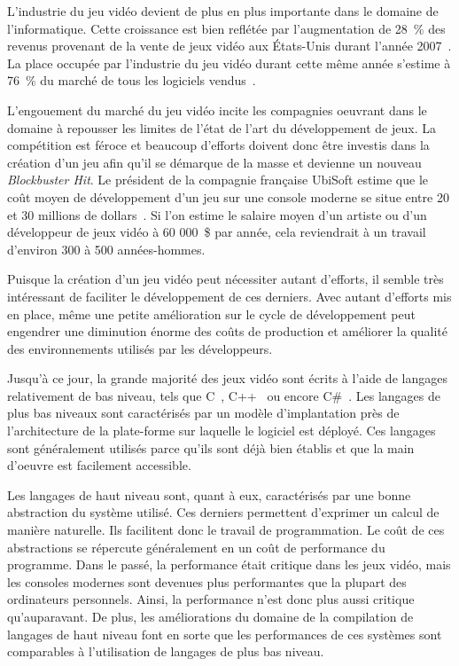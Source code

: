 \documentclass[12pt,twoside,letterpaper,francais]{book}
\begin{document}
L'industrie du jeu vidéo devient de plus en plus importante dans le
domaine de l'informatique. Cette croissance est bien reflétée par
l'augmentation de 28~\% des revenus provenant de la vente de jeux vidéo
aux États-Unis durant l'année 2007~\cite{NPD_Games_2007}. La place
occupée par l'industrie du jeu vidéo durant cette même année s'estime
à 76~\% du marché de tous les logiciels vendus~\cite{NPD_Soft_2008}. 

L'engouement du marché du jeu vidéo incite les compagnies oeuvrant
dans le domaine à repousser les limites de l'état de l'art du
dévelop\-pement de jeux. La compétition est féroce et beaucoup d'efforts
doivent donc être investis dans la création d'un jeu afin qu'il se
démarque de la masse et devienne un nouveau \textit{Blockbuster
  Hit}. Le président de la compagnie française UbiSoft estime que le
coût moyen de dévelop\-pement d'un jeu sur une console moderne se situe
entre 20 et 30 millions de dollars~\cite{cbc_ubisoft}. Si l'on estime
le salaire moyen d'un artiste ou d'un développeur de jeux vidéo à 60
000~\$ par année, cela reviendrait à un travail d'environ 300 à 500
années-hommes.

Puisque la création d'un jeu vidéo peut nécessiter autant d'efforts,
il semble très intéressant de faciliter le dévelop\-pement de ces
derniers. Avec autant d'efforts mis en place, même une petite
amélioration sur le cycle de dévelop\-pement peut engendrer une
diminution énorme des coûts de production et améliorer la qualité des
environnements utilisés par les développeurs.

Jusqu'à ce jour, la grande majorité des jeux vidéo sont écrits à
l'aide de langages relativement de bas niveau, tels que
C~\cite{Ritchie-C-dev}, C++~\cite{cplusplus} ou encore
C\#~\cite{CSHARP_SPEC}. Les langages de plus bas niveaux sont
caractérisés par un modèle d'implantation près de l'architecture de la
plate-forme sur laquelle le logiciel est déployé. Ces langages sont
généralement utilisés parce qu'ils sont déjà bien établis et que la
main d'oeuvre est facilement accessible.

Les langages de haut niveau sont, quant à eux, caractérisés par une
bonne abstraction du système utilisé. Ces derniers permettent
d'exprimer un calcul de manière naturelle. Ils facilitent donc le
travail de programmation. Le coût de ces abstractions se répercute
généralement en un coût de performance du programme. Dans le passé, la
performance était critique dans les jeux vidéo, mais les consoles
modernes sont devenues plus performantes que la plupart des
ordinateurs personnels. Ainsi, la performance n'est donc plus aussi
critique qu'auparavant. De plus, les améliorations du domaine de la
compilation de langages de haut niveau font en sorte que les
performances de ces systèmes sont comparables à l'utilisation de
langages de plus bas niveau.
\end{document}
